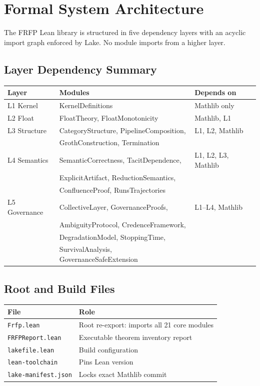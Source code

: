 \section{Formal System Architecture}

The FRFP Lean library is structured in five dependency layers with an acyclic
import graph enforced by Lake. No module imports from a higher layer.

\subsection{Layer Dependency Summary}

\begin{center}
\begin{tabular}{lll}
\toprule
Layer & Modules & Depends on \\
\midrule
L1 Kernel & KernelDefinitions & Mathlib only \\
L2 Float & FloatTheory, FloatMonotonicity & Mathlib, L1 \\
L3 Structure & CategoryStructure, PipelineComposition, & L1, L2, Mathlib \\
 & GrothConstruction, Termination & \\
L4 Semantics & SemanticCorrectness, TacitDependence, & L1, L2, L3, Mathlib \\
 & ExplicitArtifact, ReductionSemantics, & \\
 & ConfluenceProof, RunsTrajectories & \\
L5 Governance & CollectiveLayer, GovernanceProofs, & L1--L4, Mathlib \\
 & AmbiguityProtocol, CredenceFramework, & \\
 & DegradationModel, StoppingTime, & \\
 & SurvivalAnalysis, GovernanceSafeExtension & \\
\bottomrule
\end{tabular}
\end{center}

\subsection{Root and Build Files}

\begin{center}
\begin{tabular}{ll}
\toprule
File & Role \\
\midrule
\texttt{Frfp.lean} & Root re-export: imports all 21 core modules \\
\texttt{FRFPReport.lean} & Executable theorem inventory report \\
\texttt{lakefile.lean} & Build configuration \\
\texttt{lean-toolchain} & Pins Lean version \\
\texttt{lake-manifest.json} & Locks exact Mathlib commit \\
\bottomrule
\end{tabular}
\end{center}


